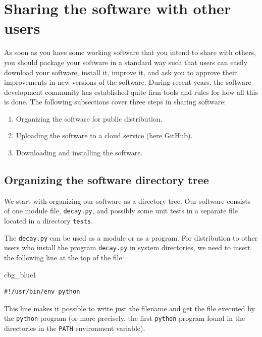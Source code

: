 \documentclass[%
oneside,                 %
final,                   %
10pt]{article}
\newenvironment{_cod_tight}[1]{
   \def\FrameCommand{\colorbox{#1}}
   \FrameRule0.6pt\MakeFramed {\FrameRestore}\vskip3mm}
   {\vskip0mm\endMakeFramed}
\newenvironment{cod}[1]{
\bgroup\rmfamily
\fboxsep=0mm\relax
\begin{_cod_tight}{#1}
\list{}{\parsep=-2mm\parskip=0mm\topsep=0pt\leftmargin=2mm
\rightmargin=2\leftmargin\leftmargin=4pt\relax}
\item\relax}
{\endlist\end{_cod_tight}\egroup}
\begin{document}
\section{Sharing the software with other users}
\label{softeng1:prog:se:git}

As soon as you have some working software that you intend to share
with others, you should package your software in a standard way such
that users can easily download your software, install it, improve it,
and ask you to approve their improvements in new versions of the software.
During recent years, the software development community has established
quite firm tools and rules for how all this is done. The following
subsections cover three steps in sharing software:

\begin{enumerate}
\item Organizing the software for public distribution.

\item Uploading the software to a cloud service (here GitHub).

\item Downloading and installing the software.
\end{enumerate}

\noindent
\subsection{Organizing the software directory tree}

We start with organizing our software as a directory tree. Our
software consists of one module file, \texttt{decay.py}, and possibly some
unit tests in a separate file located in a directory \texttt{tests}.

The \texttt{decay.py} can be used as a module or as a program. For distribution
to other users who install the program \texttt{decay.py} in system directories,
we need to insert the following line at the top of the file:

\begin{cod}{cbg_blue1}\begin{Verbatim}[numbers=none,fontsize=\fontsize{9pt}{9pt},baselinestretch=0.95,xleftmargin=2mm]
#!/usr/bin/env python
\end{Verbatim}
\end{cod}
\noindent
This line makes it possible to write just the filename and get the
file executed by the \texttt{python} program (or more precisely, the first
\texttt{python} program found in the directories in the \texttt{PATH} environment
variable).
\end{document}
